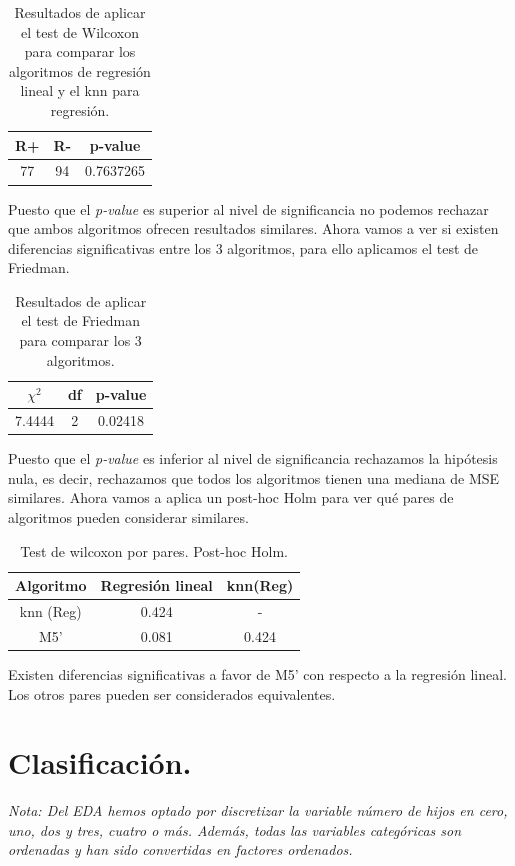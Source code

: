 \documentclass[a4paper,12pt, oneside]{book}
\begin{document}
\begin{table}[H]
\centering
\begin{tabular}{@{}ccc@{}}
\toprule
R+ & R- & p-value \\ \midrule
77 & 94 & 0.7637265 \\ \bottomrule
\end{tabular}
\caption{Resultados de aplicar el test de Wilcoxon para comparar los algoritmos de regresión lineal y el knn para regresión.}
\label{tab:wilcoxreg}
\end{table}

Puesto que el \textit{p-value} es superior al nivel de significancia no podemos rechazar que ambos algoritmos ofrecen resultados similares. Ahora vamos a ver si existen diferencias significativas entre los 3 algoritmos, para ello aplicamos el test de Friedman.

\begin{table}[H]
\centering
\begin{tabular}{@{}ccc@{}}
\toprule
$\chi^2$ & df & p-value \\ \midrule
7.4444 & 2 & 0.02418 \\ \bottomrule
\end{tabular}
\caption{Resultados de aplicar el test de Friedman para comparar los 3 algoritmos.}
\label{tab:friedmanreg}
\end{table}
Puesto que el \textit{p-value} es inferior al nivel de significancia rechazamos la hipótesis nula, es decir, rechazamos que todos los algoritmos tienen una mediana de MSE similares. Ahora vamos a aplica un post-hoc Holm para ver qué pares de algoritmos pueden considerar similares.

\begin{table}[H]
\centering
\begin{tabular}{@{}ccc@{}}
\toprule
\multicolumn{1}{l}{Algoritmo} & \multicolumn{1}{l}{Regresión lineal} & \multicolumn{1}{l}{knn(Reg)} \\ \midrule
knn (Reg) & 0.424 & - \\
M5' & 0.081 & 0.424 \\ \bottomrule
\end{tabular}
\caption{Test de wilcoxon por pares. Post-hoc Holm.}
\label{tab:friedmanreg}
\end{table}

Existen diferencias significativas a favor de M5' con respecto a la regresión lineal. Los otros pares pueden ser considerados equivalentes.

\chapter{Clasificación.}
\textit{Nota: Del EDA hemos optado por discretizar la variable número de hijos en cero, uno, dos y tres, cuatro o más. Además, todas las variables categóricas son ordenadas y han sido convertidas en factores ordenados.}
\end{document}
